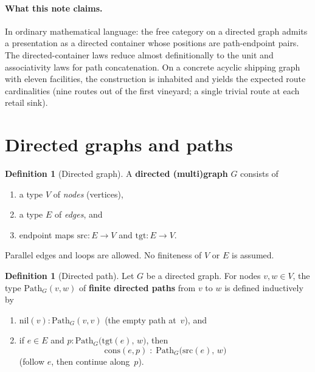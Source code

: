 \documentclass[11pt,a4paper]{article}
\theoremstyle{plain}
\theoremstyle{definition}
\newtheorem{definition}[theorem]{Definition}
\newcommand{\src}{\mathrm{src}}
\newcommand{\tgt}{\mathrm{tgt}}
\begin{document}
\paragraph{What this note claims.}
In ordinary mathematical language: the free category on a directed graph admits
a presentation as a directed container whose positions are path-endpoint pairs.
The directed-container laws reduce almost definitionally to the unit and
associativity laws for path concatenation. On a concrete acyclic shipping
graph with eleven facilities, the construction is inhabited and yields the
expected route cardinalities (nine routes out of the first vineyard; a single
trivial route at each retail sink).

\section{Directed graphs and paths}

\begin{definition}[Directed graph]\label{def:digraph}
A \textbf{directed (multi)graph} $G$ consists of
\begin{enumerate}
  \item a type $V$ of \emph{nodes} (vertices),
  \item a type $E$ of \emph{edges}, and
  \item endpoint maps $\src : E \to V$ and $\tgt : E \to V$.
\end{enumerate}
Parallel edges and loops are allowed. No finiteness of $V$ or $E$ is assumed.
\end{definition}

\begin{definition}[Directed path]\label{def:path}
Let $G$ be a directed graph. For nodes $v,w \in V$, the type $\mathrm{Path}_G(v,w)$
of \textbf{finite directed paths} from $v$ to $w$ is defined inductively by
\begin{enumerate}
  \item $\mathrm{nil}(v) : \mathrm{Path}_G(v,v)$ (the empty path at~$v$), and
  \item if $e \in E$ and $p : \mathrm{Path}_G\bigl(\tgt(e),\, w\bigr)$, then
        \[
          \mathrm{cons}(e,p) \;:\; \mathrm{Path}_G\bigl(\src(e),\, w\bigr)
        \]
        (follow $e$, then continue along~$p$).
\end{enumerate}
\end{definition}
\end{document}
